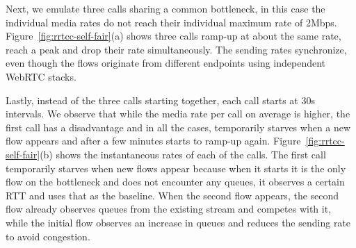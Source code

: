\begin{table}[!t]
\begin{center}
\end{center}
    \caption{RRTCC competing with similar cross-traffic on the bottleneck link.}
    \label{tab:self-fair}
\end{table}

Next, we emulate three calls sharing a common bottleneck, in this case the
individual media rates do not reach their individual maximum rate of 2Mbps.
Figure~\ref{fig:rrtcc-self-fair}(a) shows three calls ramp-up at about the
same rate, reach a peak and drop their rate simultaneously. The sending rates
synchronize, even though the flows originate from different endpoints using
independent WebRTC stacks.

Lastly, instead of the three calls starting together, each call starts at 30s
intervals. We observe that while the media rate per call on average is higher,
the first call has a disadvantage and in all the cases, temporarily starves
when a new flow appears and after a few minutes starts to ramp-up again.
Figure~\ref{fig:rrtcc-self-fair}(b) shows the instantaneous rates of each of
the calls. The first call temporarily starves when new flows appear because
when it starts it is the only flow on the bottleneck and does not encounter
any queues, it observes a certain RTT and uses that as the baseline. When the
second flow appears, the second flow already observes queues from the existing
stream and competes with it, while the initial flow observes an increase in
queues and reduces the sending rate to avoid congestion.
